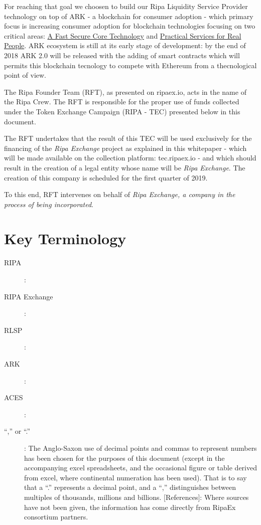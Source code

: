 \documentclass[11pt,fleqn]{book} %
\begin{document}
For reaching that goal we choosen to build our Ripa Liquidity Service Provider technology on top of ARK - a blockchain for consumer adoption - 
which primary focus is increasing consumer adoption for blockchain technologies focusing on two critical areas: \underline{A Fast Secure Core Technology}
and \underline{Practical Services for Real People}. ARK ecosystem is still at its early stage of development: by the end of 2018 ARK 2.0
will be released with the adding of smart contracts which will permits this blockchain tecnology to compete with Ethereum from a thecnological 
point of view.

The Ripa Founder Team (RFT), as presented on ripaex.io, acts in the name of the Ripa Crew. The RFT is responsible for the proper use of 
funds collected under the Token Exchange Campaign (RIPA - TEC) presented below in this document.

The RFT undertakes that the result of this TEC will be used exclusively for the financing of the \emph{Ripa Exchange} project as explained in this 
whitepaper - which will be made available on the collection platform: tec.ripaex.io - and which should result in the creation of a 
legal entity whose name will be \emph{Ripa Exchange}. The creation of this company is scheduled for the first quarter of 2019.

To this end, RFT intervenes on behalf of \emph{Ripa Exchange, a company in the process of being incorporated}.





\section{Key Terminology}
\begin{description}
	\item[RIPA]: \lipsum[1]
    \item[RIPA Exchange]: \lipsum[2]
    \item[RLSP]: \lipsum[3]
	\item[ARK]: \lipsum[4]
    \item[ACES]: \lipsum[5]
    \item[“,” or “.”]: The Anglo-Saxon use of decimal points and commas to represent numbers has
been chosen for the purposes of this document (except in the accompanying excel
spreadsheets, and the occasional figure or table derived from excel, where continental
numeration has been used). That is to say that a “.” represents a decimal point, and a “,”
distinguishes between multiples of thousands, millions and billions.
[References]: Where sources have not been given, the information has come directly from
RipaEx consortium partners.
    \end{description}
\end{document}

